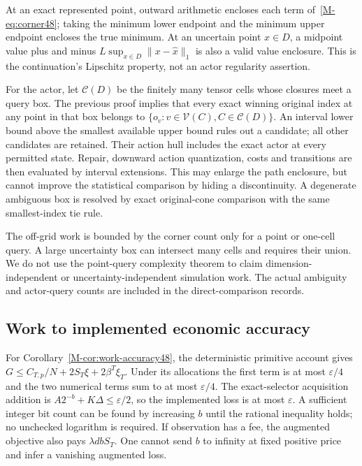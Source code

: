At an exact represented point, outward arithmetic encloses each term of~\eqref{M-eq:corner48}; taking the minimum lower endpoint and the minimum upper endpoint encloses the true minimum. At an uncertain point $x\in D$, a midpoint value plus and minus $L\sup_{x\in D}\|x-\widehat x\|_1$ is also a valid value enclosure. This is the continuation's Lipschitz property, not an actor regularity assertion.

For the actor, let $\mathcal C(D)$ be the finitely many tensor cells whose closures meet a query box. The previous proof implies that every exact winning original index at any point in that box belongs to $\{o_v:v\in\mathcal V(C),C\in\mathcal C(D)\}$. An interval lower bound above the smallest available upper bound rules out a candidate; all other candidates are retained. Their action hull includes the exact actor at every permitted state. Repair, downward action quantization, costs and transitions are then evaluated by interval extensions. This may enlarge the path enclosure, but cannot improve the statistical comparison by hiding a discontinuity. A degenerate ambiguous box is resolved by exact original-cone comparison with the same smallest-index tie rule.

The off-grid work is bounded by the corner count only for a point or one-cell query. A large uncertainty box can intersect many cells and requires their union. We do not use the point-query complexity theorem to claim dimension-independent or uncertainty-independent simulation work. The actual ambiguity and actor-query counts are included in the direct-comparison records.


\subsection{Work to implemented economic accuracy}
For Corollary~\ref{M-cor:work-accuracy48}, the deterministic primitive account gives $G\le C_{T,p}/N+2S_T\xi+2\beta^T\xi_T$. Under its allocations the first term is at most $\varepsilon/4$ and the two numerical terms sum to at most $\varepsilon/4$. The exact-selector acquisition addition is $A2^{-b}+K\Delta\le\varepsilon/2$, so the implemented loss is at most $\varepsilon$. A sufficient integer bit count can be found by increasing $b$ until the rational inequality holds; no unchecked logarithm is required. If observation has a fee, the augmented objective also pays $\lambda dbS_T$. One cannot send $b$ to infinity at fixed positive price and infer a vanishing augmented loss.

